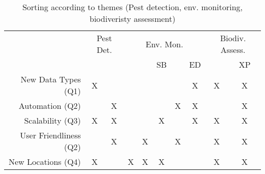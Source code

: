 \begin{table}
    \centering 
    \begin{tabular}{r|ccccccccc}
        & \multicolumn{2}{c}{Pest Det.} & \multicolumn{5}{c}{Env. Mon.} & \multicolumn{2}{c}{Biodiv. Assess.}  \\
         & \cite{Geckeler2023a} & \cite{Geckeler2024a} &  \cite{Geckeler2022a} & \cite{Geckeler2023b} & SB & \cite{Geckeler2024} & ED & \cite{Kirchgeorg2024} & XP \\
         \hline \hline
         New Data Types (Q1)  & X &   &   &   &   &   & X & X & X\\
         \hline
         Automation (Q2)           &   & X &   &   &   & X & X &   & X\\
         \hline
         Scalability (Q3)          & X & X &   &   & X &   & X &  X & X\\
         \hline
         User Friendliness (Q2)    &   & X &   & X &   & X &   &  X & X\\
         \hline
         New Locations (Q4)        & X &   & X & X & X &   &   &  X & X\\
    \end{tabular}
    \caption{Sorting according to themes (Pest detection, env. monitoring, biodiveristy assessment)}
    \label{tab:my_label}
\end{table}

